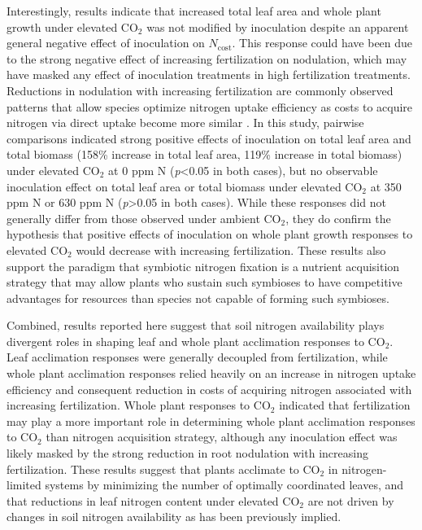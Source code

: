 Interestingly, results indicate that increased total leaf area and whole plant growth under elevated CO$_2$ was not modified by inoculation despite an apparent general negative effect of inoculation on $N_\mathrm{cost}$. This response could have been due to the strong negative effect of increasing fertilization on nodulation, which may have masked any effect of inoculation treatments in high fertilization treatments. Reductions in nodulation with increasing fertilization are commonly observed patterns that allow species optimize nitrogen uptake efficiency as costs to acquire nitrogen via direct uptake become more similar . In this study, pairwise comparisons indicated strong positive effects of inoculation on total leaf area and total biomass (158\% increase in total leaf area, 119\% increase in total biomass) under elevated CO$_2$ at 0 ppm N (\textit{p}<0.05 in both cases), but no observable inoculation effect on total leaf area or total biomass under elevated CO$_2$ at 350 ppm N or 630 ppm N (\textit{p}>0.05 in both cases). While these responses did not generally differ from those observed under ambient CO$_2$, they do confirm the hypothesis that positive effects of inoculation on whole plant growth responses to elevated CO$_2$ would decrease with increasing fertilization. These results also support the paradigm that symbiotic nitrogen fixation is a nutrient acquisition strategy that may allow plants who sustain such symbioses to have competitive advantages for resources than species not capable of forming such symbioses.

Combined, results reported here suggest that soil nitrogen availability plays divergent roles in shaping leaf and whole plant acclimation responses to CO$_2$. Leaf acclimation responses were generally decoupled from fertilization, while whole plant acclimation responses relied heavily on an increase in nitrogen uptake efficiency and consequent reduction in costs of acquiring nitrogen associated with increasing fertilization. Whole plant responses to CO$_2$ indicated that fertilization may play a more important role in determining whole plant acclimation responses to CO$_2$ than nitrogen acquisition strategy, although any inoculation effect was likely masked by the strong reduction in root nodulation with increasing fertilization. These results suggest that plants acclimate to CO$_2$ in nitrogen-limited systems by minimizing the number of optimally coordinated leaves, and that reductions in leaf nitrogen content under elevated CO$_2$ are not driven by changes in soil nitrogen availability as has been previously implied.

